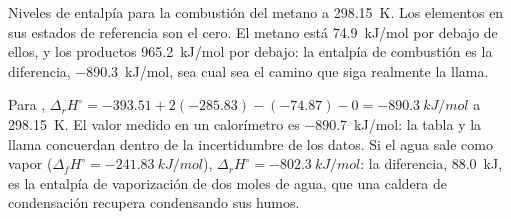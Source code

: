 \begin{omfigure}

{\small Niveles de entalpía para la combustión del metano a \qty{298.15}{K}.
Los elementos en sus estados de referencia son el cero. El metano está
\qty{74.9}{kJ/mol} por debajo de ellos, y los productos \qty{965.2}{kJ/mol} por debajo:
la entalpía de combustión es la diferencia, \qty{-890.3}{kJ/mol}, sea cual sea
el camino que siga realmente la llama.}
\end{omfigure}

\begin{example}\label{ex:b2:reaction-enthalpy:methane}
Para ,
$\Delta_r H^\circ = -393.51 + 2(-285.83) - (-74.87) - 0 =
\qty{-890.3}{kJ/mol}$ a \qty{298.15}{K}. El valor medido en un
calorímetro es \qty{-890.7}{kJ/mol}: la tabla y la llama concuerdan dentro de
la incertidumbre de los datos. Si el agua sale como vapor
($\Delta_f H^\circ = \qty{-241.83}{kJ/mol}$), $\Delta_r H^\circ =
\qty{-802.3}{kJ/mol}$: la diferencia, \qty{88.0}{kJ}, es la entalpía de
vaporización de dos moles de agua, que una caldera de condensación recupera
condensando sus humos.
\end{example}

